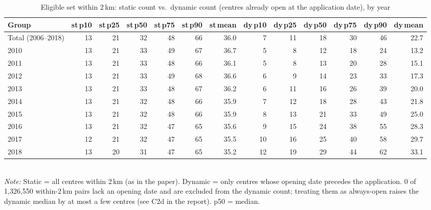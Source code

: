 \begin{table}[htbp]\centering
\caption{Eligible set within 2\,km: static count vs.\ dynamic count (centres already open at the application date), by year}
\label{tab:C2}
\footnotesize
\setlength{\tabcolsep}{4pt}
\begin{tabular}{lrrrrrrrrrrrr}
\toprule
Group & st\,p10 & st\,p25 & st\,p50 & st\,p75 & st\,p90 & st\,mean & dy\,p10 & dy\,p25 & dy\,p50 & dy\,p75 & dy\,p90 & dy\,mean \\
\midrule
Total (2006--2018) & 13 & 21 & 32 & 48 & 66 & 36.0 & 7 & 11 & 18 & 30 & 46 & 22.7 \\
2010 & 13 & 21 & 33 & 49 & 67 & 36.7 & 5 & 8 & 12 & 18 & 24 & 13.2 \\
2011 & 13 & 21 & 33 & 48 & 66 & 36.1 & 5 & 8 & 13 & 20 & 28 & 15.1 \\
2012 & 13 & 21 & 33 & 49 & 68 & 36.6 & 6 & 9 & 14 & 23 & 33 & 17.3 \\
2013 & 13 & 21 & 33 & 48 & 67 & 36.2 & 6 & 11 & 16 & 26 & 39 & 20.0 \\
2014 & 13 & 21 & 32 & 48 & 66 & 35.9 & 7 & 12 & 18 & 28 & 43 & 21.8 \\
2015 & 13 & 21 & 32 & 48 & 66 & 35.9 & 8 & 13 & 21 & 33 & 49 & 25.0 \\
2016 & 13 & 21 & 32 & 47 & 65 & 35.6 & 9 & 15 & 24 & 38 & 55 & 28.3 \\
2017 & 12 & 21 & 32 & 47 & 65 & 35.5 & 10 & 16 & 25 & 40 & 58 & 29.7 \\
2018 & 13 & 20 & 31 & 47 & 65 & 35.2 & 12 & 19 & 29 & 44 & 62 & 33.1 \\
\bottomrule
\end{tabular}
\\[3pt]{\footnotesize \textit{Note:} Static = all centres within 2\,km (as in the paper). Dynamic = only centres whose opening date precedes the application. 0 of 1,326,550 within-2\,km pairs lack an opening date and are excluded from the dynamic count; treating them as always-open raises the dynamic median by at most a few centres (see C2d in the report). p50 = median.}
\end{table}
